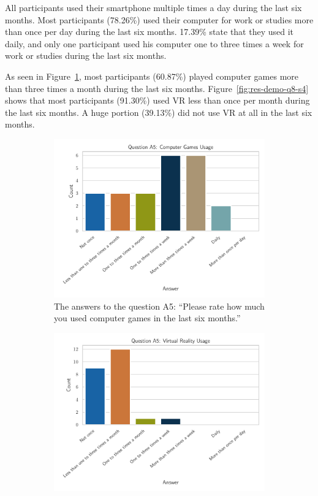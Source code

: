 All participants used their smartphone multiple times a day during the last six months. Most participants (78.26\%) used their computer for work or studies more than once per day during the last six months. 17.39\% state that they used it daily, and only one participant used his computer one to three times a week for work or studies during the last six months.

As seen in Figure~\ref{fig:res-demo-q8-s3}, most participants (60.87\%) played computer games more than three times a month during the last six months. Figure~\ref{fig:res-demo-q8-s4} shows that most participants (91.30\%) used \ac{VR} less than once per month during the last six months. A huge portion (39.13\%) did not use \ac{VR} at all in the last six months.

\begin{figure}[H]
	\centering
	\begin{subfigure}{.48\linewidth}%
		\centering
		\includegraphics[width=\linewidth]{figures/evaluation/res_demo_q8_s3.pdf}
		\caption{The answers to the question A5: \enquote{Please rate how much you used computer games in the last six months.}}\label{fig:res-demo-q8-s3}
	\end{subfigure}%
	\hspace{0.03\linewidth}
	\begin{subfigure}{.48\linewidth}%
		\centering
		\includegraphics[width=\linewidth]{figures/evaluation/res_demo_q8_s4.pdf}

\end{subfigure}
\end{figure}
